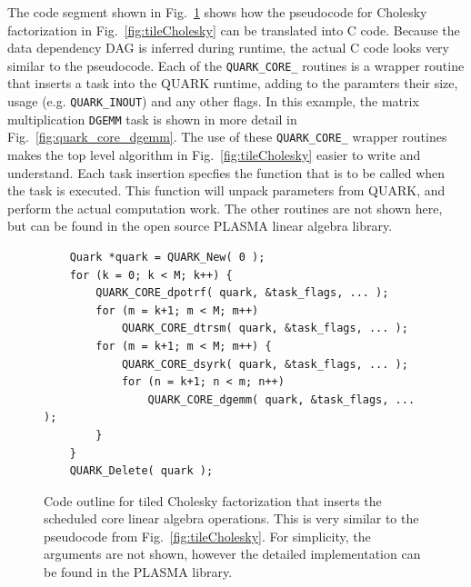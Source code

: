 \documentclass[11pt,letterpaper]{report}
\begin{document}
The code segment shown in Fig.~\ref{fig:tileCholeskyCode} shows how
the pseudocode for Cholesky factorization in
Fig.~\ref{fig:tileCholesky} can be translated into C code.  Because
the data dependency DAG is inferred during runtime, the actual C code
looks very similar to the pseudocode.  Each of the \verb|QUARK_CORE_|
routines is a wrapper routine that inserts a task into the QUARK
runtime, adding to the paramters their size, usage (e.g. \verb|QUARK_INOUT|)
and any other flags. In this example, the matrix multiplication
\verb|DGEMM| task is shown in more detail in
Fig.~\ref{fig:quark_core_dgemm}.  The use of these \verb|QUARK_CORE_|
wrapper routines makes the top level algorithm in
Fig.~\ref{fig:tileCholesky} easier to write and understand.  Each task
insertion specfies the function that is to be called when the task is
executed.  This function will unpack parameters from QUARK, and
perform the actual computation work.  The other routines are not shown
here, but can be found in the open source PLASMA linear algebra
library.
\begin{figure}[pbt]
\centering
\scriptsize
\begin{lstlisting}
    Quark *quark = QUARK_New( 0 );
    for (k = 0; k < M; k++) {
        QUARK_CORE_dpotrf( quark, &task_flags, ... );
        for (m = k+1; m < M; m++)
            QUARK_CORE_dtrsm( quark, &task_flags, ... );
        for (m = k+1; m < M; m++) {
            QUARK_CORE_dsyrk( quark, &task_flags, ... );
            for (n = k+1; n < m; n++)
                QUARK_CORE_dgemm( quark, &task_flags, ... );
        }
    }
    QUARK_Delete( quark );
\end{lstlisting}
\caption{Code outline for tiled Cholesky factorization that inserts
  the scheduled core linear algebra operations.  This is very similar
  to the pseudocode from Fig.~\ref{fig:tileCholesky}.  For simplicity,
  the arguments are not shown, however the detailed implementation can
  be found in the PLASMA library. }
\label{fig:tileCholeskyCode}
\end{figure}
\end{document}
